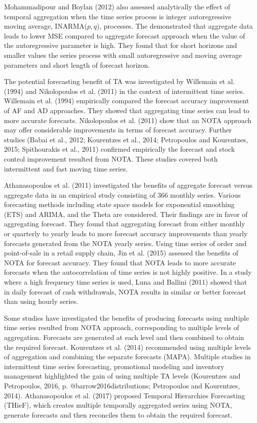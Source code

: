 \documentclass[]{elsarticle} %
\begin{document}
Mohammadipour and Boylan (2012) also assessed analytically the effect of
temporal aggregation when the time series process is integer
autoregressive moving average, INARMA(\(p,q\)), processes. The
demonstrated that aggregate data leads to lower MSE compared to
aggregate forecast approach when the value of the autoregressive
parameter is high. They found that for short horizons and smaller values
the series process with small autoregressive and moving average
parameters and short length of forecast horizon.

The potential forecasting benefit of TA was investigated by Willemain et
al. (1994) and Nikolopoulos et al. (2011) in the context of intermittent
time series. Willemain et al. (1994) empirically compared the forecast
accuracy improvement of AF and AD approaches. They showed that
aggregating time series can lead to more accurate forecasts.
Nikolopoulos et al. (2011) show that an NOTA approach may offer
considerable improvements in terms of forecast accuracy. Further studies
(Babai et al., 2012; Kourentzes et al., 2014; Petropoulos and
Kourentzes, 2015; Spithourakis et al., 2011) confirmed empirically the
forecast and stock control improvement resulted from NOTA. These studies
covered both intermittent and fast moving time series.

Athanasopoulos et al. (2011) investigated the benefits of aggregate
forecast versus aggregate data in an empirical study consisting of 366
monthly series. Various forecasting methods including state space models
for exponential smoothing (ETS) and ARIMA, and the Theta are considered.
Their findings are in favor of aggregating forecast. They found that
aggregating forecast from either monthly or quarterly to yearly leads to
more forecast accuracy improvements than yearly forecasts generated from
the NOTA yearly series. Using time series of order and point-of-sale in
a retail supply chain, Jin et al. (2015) assessed the benefits of NOTA
for forecast accuracy. They found that NOTA leads to more accurate
forecasts when the autocorrelation of time series is not highly
positive. In a study where a high frequency time series is used, Luna
and Ballini (2011) showed that in daily forecast of cash withdrawals,
NOTA results in similar or better forecast than using hourly series.

Some studies have investigated the benefits of producing forecasts using
multiple time series resulted from NOTA approach, corresponding to
multiple levels of aggregation. Forecasts are generated at each level
and then combined to obtain the required forecast. Kourentzes et al.
(2014) recommended using multiple levels of aggregation and combining
the separate forecasts (MAPA). Multiple studies in intermittent time
series forecasting, promotional modeling and inventory management
highlighted the gain of using multiple TA levels (Kourentzes and
Petropoulos, 2016, p. @barrow2016distributions; Petropoulos and
Kourentzes, 2014). Athanasopoulos et al. (2017) proposed Temporal
Hierarchies Forecasting (THieF), which creates multiple temporally
aggregated series using NOTA, generate forecasts and then reconciles
them to obtain the required forecast.
\end{document}
